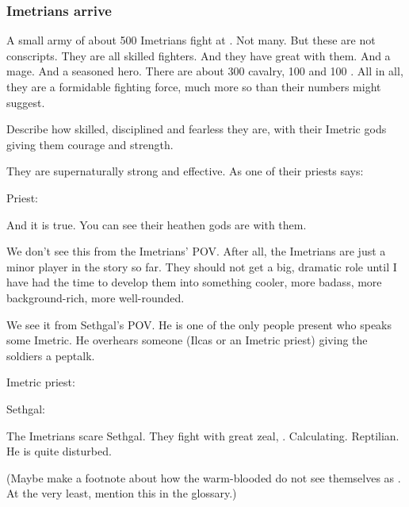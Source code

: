 \subsubsection{Imetrians arrive}
A small army of about 500 Imetrians fight at \Forclin. 
Not many. 
But these are not conscripts.
They are all skilled fighters.
And they have great \saurians with them. 
And a mage.
And a seasoned hero.
There are about 300 cavalry, 100 \nycaneers and 100 \nycans. 
All in all, they are a formidable fighting force, much more so than their numbers might suggest. 

Describe how skilled, disciplined and fearless they are, with their Imetric gods giving them courage and strength. 

They are supernaturally strong and effective.
As one of their priests says: 

\begin{prose}
  Priest: 
\end{prose}

And it is true. 
You can see their heathen gods are with them. 

We don't see this from the Imetrians' POV. 
After all, the Imetrians are just a minor player in the story so far. 
They should not get a big, dramatic role until I have had the time to develop them into something cooler, more badass, more background-rich, more well-rounded. 

We see it from Sethgal's POV. 
He is one of the only people present who speaks some Imetric. 
He overhears someone (Ilcas or an Imetric priest) giving the soldiers a peptalk. 

\begin{prose}
  Imetric priest: 
  
  Sethgal: 
\end{prose}

The Imetrians scare Sethgal. 
They fight with great zeal, . 
Calculating. 
Reptilian. 
He is quite disturbed.

(Maybe make a footnote about how the warm-blooded \scathae{} do not see themselves as . At the very least, mention this in the glossary.)

